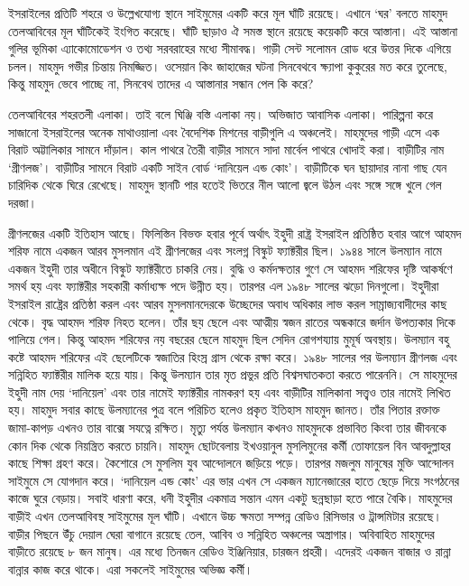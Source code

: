 \documentclass[
]{book}
\begin{document}
ইসরাইলের প্রতিটি শহরে ও উল্লেখযোগ্য স্থানে সাইমুমের একটি করে মূল ঘাঁটি রয়েছে। এখানে `ঘর' বলতে মাহমুদ তেলআবিবের মূল ঘাঁটিকেই ইংগিত করেছে। ঘাঁটি ছাড়াও ঐ সমস্ত স্থানে রয়েছে কয়েকটি করে আস্তানা। এই আস্তানা গুলির ভূমিকা এ্যাকোমোডেশন ও তথ্য সরবরাহের মধ্যে সীমাবদ্ধ। গাড়ী সেন্ট সলোমন রোড ধরে উত্তর দিকে এগিয়ে চলল। মাহমুদ গভীর চিন্তায় নিমজ্জিত। ওসেয়ান কিং জাহাজের ঘটনা সিনবেথবে ক্ষ্যাপা কুকুরের মত করে তুলেছে, কিন্তু মাহমুদ ভেবে পাচ্ছে না, সিনবেথ তাদের এ আস্তানার সন্ধান পেল কি করে?

তেলআবিবের শহরতলী এলাকা। তাই বলে ঘিঞ্জি বস্তি এলাকা নয়। অভিজাত আবাসিক এলাকা। পারিল্পনা করে সাজানো ইসরাইলের অনেক মাথাওয়ালা এবং বৈদেশিক মিশনের বাড়ীগুলি এ অঞ্চলেই। মাহমুদের গাড়ী এসে এক বিরাট অট্টালিকার সামনে দাঁড়াল। কাল পাথরে তৈরী বাড়ীর সামনে সাদা মার্বেল পাথরে খোদাই করা। বাড়ীটির নাম `গ্রীণলজ'। বাড়ীটির সামনে বিরাট একটি সাইন বোর্ড `দানিয়েল এন্ড কোং'। বাড়ীটিকে ঘন ছায়াদার নানা গাছ যেন চারিদিক থেকে ঘিরে রেখেছে। মাহমুদ স্থানটি পার হতেই ভিতরে নীল আলো জ্বলে উঠল এবং সঙ্গে সঙ্গে খুলে গেল দরজা।

গ্রীণলজের একটি ইতিহাস আছে। ফিলিস্তিন বিভক্ত হবার পূর্বে অর্থাৎ ইহুদী রাষ্ট্র ইসরাইল প্রতিষ্ঠিত হবার আগে আহমদ শরিফ নামে একজন আরব মুসলমান এই গ্রীণলজের এবং সংলগ্ন বিস্কুট ফ্যাক্টরীর ছিল। ১৯৪৪ সালে উলম্যান নামে একজন ইহুদী তার অধীনে বিস্কুট ফ্যাক্টরীতে চাকরি নেয়। বুদ্ধি ও কর্মদক্ষতার গুণে সে আহমদ শরিফের দৃষ্টি আকর্ষণে সমর্থ হয় এবং ফ্যাক্টরীর সহকারী কর্মাধ্যক্ষ পদে উন্নীত হয়। তারপর এল ১৯৪৮ সালের ঝড়ো দিনগুলো। ইহুদীরা ইসরাইল রাষ্ট্রের প্রতিষ্ঠা করল এবং আরব মুসলমানদেরকে উচ্ছেদের অবাধ অধিকার লাভ করল সাম্রাজ্যবাদীদের কাছ থেকে। বৃদ্ধ আহমদ শরিফ নিহত হলেন। তাঁর ছয় ছেলে এবং আত্মীয় স্বজন রাতের অন্ধকারে জর্দান উপত্যকার দিকে পালিয়ে গেল। কিন্তু আহমদ শরিফের নয় বছরের ছেলে মাহমুদ ছিল সেদিন রোগশয্যায় মুমূর্ষ অবস্থায়। উলম্যান বহু কষ্টে আহমদ শরিফের এই ছেলেটিকে স্বজাতির হিংস্র গ্রাস থেকে রক্ষা করে। ১৯৪৮ সালের পর উলম্যান গ্রীণলজ এবং সন্নিহিত ফ্যাক্টরীর মালিক হয়ে যায়। কিন্তু উলম্যান তার মৃত প্রভুর প্রতি বিশ্বসঘাতকতা করতে পারেননি। সে মাহমুদের ইহুদী নাম দেয় `দানিয়েল' এবং তার নামেই ফ্যাক্টরীর নামকরণ হয় এবং বাড়ীটির মালিকানা সত্ত্বও তার নামেই লিখিত হয়। মাহমুদ সবার কাছে উলম্যানের পুত্র বলে পরিচিত হলেও প্রকৃত ইতিহাস মাহমুদ জানত। তাঁর পিতার রক্তাক্ত জামা-কাপড় এখনও তার বাক্সে সযত্নে রক্ষিত। মৃত্যু পর্যন্ত উলম্যান কখনও মাহমুদকে প্রভাবিত কিংবা তার জীবনকে কোন দিক থেকে নিয়ন্ত্রিত করতে চায়নি। মাহমুদ ছোটবেলায় ইখওয়ানুল মুসলিমুনের কর্মী তোফায়েল বিন আবদুল্লাহর কাছে শিক্ষা গ্রহণ করে। কৈশোরে সে মুসলিম যুব আন্দোলনে জড়িয়ে পড়ে। তারপর মজলুম মানুষের মুক্তি আন্দোলন সাইমুমে সে যোগদান করে। `দানিয়েল এন্ড কোং' এর ভার এখন সে একজন ম্যানেজারের হাতে ছেড়ে দিয়ে সংগঠনের কাজে ঘুরে বেড়ায়। সবাই ধারণা করে, ধনী ইহুদীর একমাত্র সন্তান এমন একটু ছন্নছাড়া হতে পারে বৈকি। মাহমুদের বাড়ীই এখন তেলআবিবস্থ সাইমুমের মূল ঘাঁটি। এখানে উচ্চ ক্ষমতা সম্পন্ন রেডিও রিসিভার ও ট্রান্সমিটার রয়েছে। বাড়ীর পিছনে উঁচু দেয়াল ঘেরা বাগানে রয়েছে তেল, আবিব ও সন্নিহিত অঞ্চলের অস্ত্রাগার। অবিবাহিত মাহমুদের বাড়ীতে রয়েছে ৮ জন মানুষ। এর মধ্যে তিনজন রেডিও ইঞ্জিনিয়ার, চারজন প্রহরী। এদেরই একজন বাজার ও রান্না বান্নার কাজ করে থাকে। এরা সকলেই সাইমুমের অভিজ্ঞ কর্মী।
\end{document}
